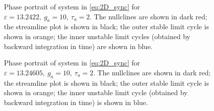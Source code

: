 \begin{figure}[!h]
        \caption{\label{fig:eq2D_cycle_homoclinic} Phase portrait of system in \eqref{eq:2D_sync} for $\varepsilon=13.2422,\ g_a=10,\ \tau_a=2$. The nullclines are shown in dark red; the streamline plot is shown in black; the outer stable limit cycle is shown in orange; the inner unstable limit cycles (obtained by backward integration in time) are shown in blue.}
\end{figure}

\begin{figure}[!h]
        \caption{\label{fig:eq2D_cycle_before_collapse} Phase portrait of system in \eqref{eq:2D_sync} for $\varepsilon=13.24605,\ g_a=10,\ \tau_a=2$. The nullclines are shown in dark red; the streamline plot is shown in black; the outer stable limit cycle is shown in orange; the inner unstable limit cycle (obtained by backward integration in time) is shown in blue.}
\end{figure}


